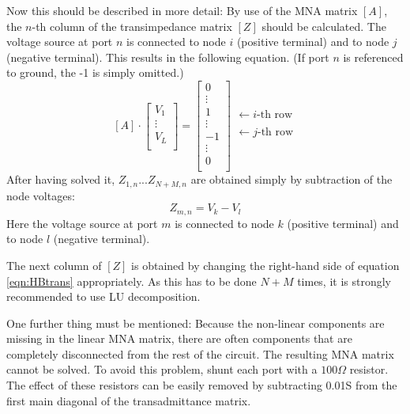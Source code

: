 Now this should be described in more detail: By use of the MNA matrix
$[A]$, the $n$-th column of the transimpedance matrix $[Z]$ should be
calculated. The voltage source at port $n$ is connected to node $i$
(positive terminal) and to node $j$ (negative terminal). This results
in the following equation. (If port $n$ is referenced to ground, the
-1 is simply omitted.)
\begin{equation}
\label{eqn:HBtrans}
[A]\cdot
\begin{bmatrix}
V_1\\
\vdots\\
V_L\\
\end{bmatrix}
=
\begin{bmatrix}
0\\
\vdots\\
1\\
\vdots\\
-1\\
\vdots\\
0\\
\end{bmatrix}
\begin{matrix}
 \\
 \\
\leftarrow i\text{-th row}\\
 \\
\leftarrow j\text{-th row}\\
 \\
 \\
\end{matrix}
\end{equation}
After having solved it, $Z_{1,n}$...$Z_{N+M,n}$ are obtained
simply by subtraction of the node voltages:
\begin{equation}
Z_{m,n} = V_k - V_l
\end{equation}
Here the voltage source at port $m$ is connected to node $k$
(positive terminal) and to node $l$ (negative terminal).

\addvspace{12pt}

The next column of $[Z]$ is obtained by changing the right-hand
side of equation \eqref{eqn:HBtrans} appropriately. As this has to
be done $N+M$ times, it is strongly recommended to use LU
decomposition.

\addvspace{12pt}

One further thing must be mentioned: Because the non-linear
components are missing in the linear MNA matrix, there are often
components that are completely disconnected from the rest of the
circuit. The resulting MNA matrix cannot be solved. To avoid
this problem, shunt each port with a $100\Omega$ resistor. The
effect of these resistors can be easily removed by subtracting
0.01S from the first main diagonal of the transadmittance matrix.


